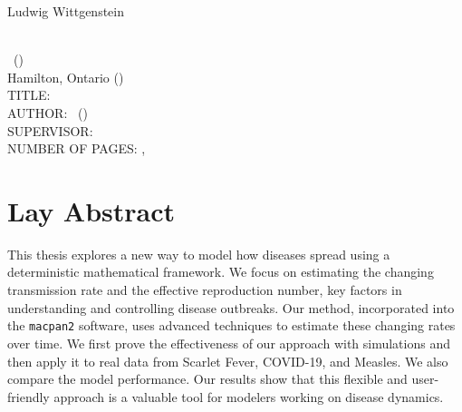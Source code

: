 \documentclass[
11pt, %
oneside, %
english, %
singlespacing, %
]{macthesis} %
\def\blankpage{%
      \clearpage%
      \thispagestyle{empty}%
      \addtocounter{page}{-1}%
      \null%
      \clearpage}
\begin{document}
\hfill\textemdash Ludwig Wittgenstein

\blankpage
\clearpage




\blankpage
\clearpage


\newpage
{} %
\setcounter{page}{2} %

\noindent %
\univname \\
\degreename\, (\the\year) \\
Hamilton, Ontario (\deptname) \\[1.5cm]
TITLE: \ttitle \\
AUTHOR: \authorname\,  %
(\univname)  \\
SUPERVISOR: \supname\, \\
NUMBER OF PAGES: \pageref{lastoffront}, \pageref{LastPage}  %

\clearpage

\section*{Lay Abstract}
  This thesis explores a new way to model how diseases spread using a deterministic mathematical framework. We focus on estimating the changing transmission rate and the effective reproduction number, key factors in understanding and controlling disease outbreaks. Our method, incorporated into the \texttt{macpan2} software, uses advanced techniques to estimate these changing rates over time. We first prove the effectiveness of our approach with simulations and then apply it to real data from Scarlet Fever, COVID-19, and Measles. We also compare the model performance. Our results show that this flexible and user-friendly approach is a valuable tool for modelers working on disease dynamics.
\blankpage
\clearpage
\end{document}
